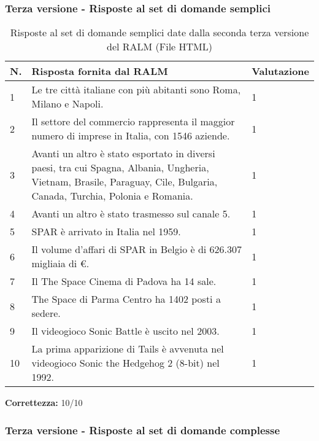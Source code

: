 \subsubsection{Terza versione - Risposte al set di domande semplici}

\begin{table}[H]
    \centering
    \begin{tabular}{|p{0.5cm} |p{6cm} |p{2cm}|}
        \hline
        \textbf{N}. & \textbf{Risposta fornita dal RALM} & \textbf{Valutazione} \\
        \hline
        1 & Le tre città italiane con più abitanti sono Roma, Milano e Napoli. & 1 \\
        \hline
        2 & Il settore del commercio rappresenta il maggior numero di imprese in Italia, con 1546 aziende. & 1 \\
        \hline
        3 & Avanti un altro è stato esportato in diversi paesi, tra cui Spagna, Albania, Ungheria, Vietnam, Brasile, Paraguay, Cile, Bulgaria, Canada, Turchia, Polonia e Romania. & 1 \\
        \hline
        4 & Avanti un altro è stato trasmesso sul canale 5. & 1 \\
        \hline
        5 & SPAR è arrivato in Italia nel 1959. & 1 \\
        \hline
        6 & Il volume d'affari di SPAR in Belgio è di 626.307 migliaia di €. & 1 \\
        \hline
        7 & Il The Space Cinema di Padova ha 14 sale. & 1 \\
        \hline
        8 & The Space di Parma Centro ha 1402 posti a sedere. & 1 \\
        \hline
        9 & Il videogioco Sonic Battle è uscito nel 2003. & 1 \\
        \hline
        10 & La prima apparizione di Tails è avvenuta nel videogioco Sonic the Hedgehog 2 (8-bit) nel 1992. & 1 \\
        \hline
    \end{tabular}
    \caption{Risposte al set di domande semplici date dalla seconda terza versione del RALM (File HTML)}
\end{table}

\textbf{Correttezza:} 10/10

\subsubsection{Terza versione - Risposte al set di domande complesse}

